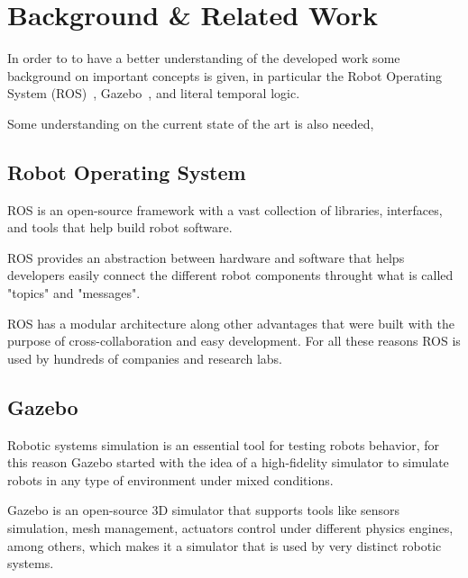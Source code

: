 \chapter{Background \& Related Work}
\label{chap:background}

In order to to have a better understanding of the developed work some background on important concepts is given, in particular the Robot Operating System (ROS)~\cite{Ros}, Gazebo~\cite{Gazebo}, and literal temporal logic.

Some understanding on the current state of the art is also needed,

\section{Robot Operating System}
\label{sec:ros}

ROS is an open-source framework with a vast collection of libraries, interfaces, and tools that help build robot software. 

ROS provides an abstraction between hardware and software that helps developers easily connect the different robot components throught what is called "topics" and "messages".

ROS has a modular architecture along other advantages that were built with the purpose of cross-collaboration and easy development. For all these reasons ROS is used by hundreds of companies and research labs.

\section{Gazebo}
\label{sec:gazebo}

Robotic systems simulation is an essential tool for testing robots behavior, for this reason Gazebo started with the idea of a high-fidelity simulator to simulate robots in any type of environment under mixed conditions.

Gazebo is an open-source 3D simulator that supports tools like sensors simulation, mesh management, actuators control under different physics engines, among others, which makes it a simulator that is used by very distinct robotic systems.

